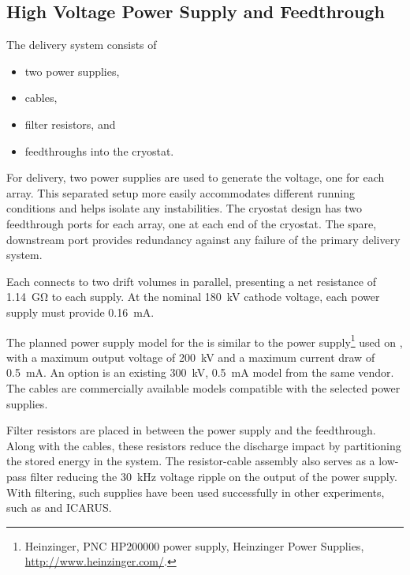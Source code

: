 \subsection {High Voltage Power Supply and Feedthrough}
The  delivery system consists of
\begin{itemize}
\item two power supplies,
\item {} cables,
\item filter resistors, and
\item {} feedthroughs into the cryostat.
\end{itemize}

For  delivery, two power supplies are used to generate the voltage, one for each  array. 
This separated setup more easily accommodates different running conditions and helps isolate any instabilities. %
The cryostat design has two feedthrough ports for each  array, one at each end of the cryostat. The spare, downstream port provides redundancy against any failure of the primary  delivery system. 

Each  connects to two drift volumes in parallel, presenting a net resistance of \SI{1.14}{\giga\ohm} to each supply. At the nominal \SI{180}{kV} cathode voltage, each power supply must provide \SI{0.16}{mA}.

The planned power supply model for the  is similar to the power supply\footnote{Heinzinger, PNC HP200000  power supply, Heinzinger\texttrademark{} Power Supplies, \url{http://www.heinzinger.com/}.} used on , with a maximum output voltage of \SI{200}{kV} and a maximum current draw of \SI{0.5}{mA}.  An %
option is an existing \SI{300}{kV}, \SI{0.5}{mA} model from the same vendor.
The  cables are commercially available models compatible with the selected power supplies. 


Filter resistors are placed in between the power supply and the feedthrough.  Along with the cables, these resistors reduce the discharge impact by partitioning the stored energy in the system.  The resistor-cable assembly also serves as a low-pass filter reducing the \SI{30}{kHz} voltage ripple on the output of the power supply.  With filtering, such supplies have been used successfully in other \lartpc experiments, such as \microboone and ICARUS.

